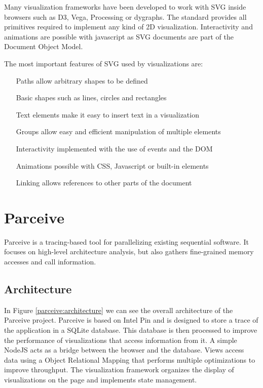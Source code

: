 Many visualization frameworks have been developed to work with SVG inside browsers such as D3, Vega, Processing or dygraphs. The standard provides all primitives required to implement any kind of 2D visualization. Interactivity and animations are possible with javascript as SVG documents are part of the Document Object Model.

The most important features of SVG used by visualizations are:

\begin{itemize}
	\item[Paths] allow arbitrary shapes to be defined
	\item[Basic shapes] such as lines, circles and rectangles
	\item[Text elements] make it easy to insert text in a visualization
	\item[Groups] allow easy and efficient manipulation of multiple elements
	\item[Interactivity] implemented with the use of events and the DOM
	\item[Animations] possible with CSS, Javascript or built-in elements
	\item[Linking] allows references to other parts of the document
\end{itemize}

\section{Parceive}
\label{cap2:parceve}

Parceive \cite{parceive} is a tracing-based tool for parallelizing existing sequential software. It focuses on high-level architecture analysis, but also gathers fine-grained memory accesses and call information.

\subsection{Architecture}

In Figure \ref{parceive:architecture} we can see the overall architecture of the Parceive project. Parceive is based on Intel Pin and is designed to store a trace of the application in a SQLite database. This database is then processed to improve the performance of visualizations that access information from it. A simple NodeJS acts as a bridge between the browser and the database. Views access data using a Object Relational Mapping that performs multiple optimizations to improve throughput. The visualization framework organizes the display of visualizations on the page and implements state management.

